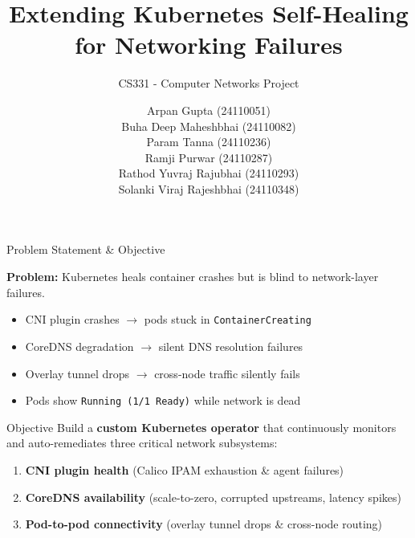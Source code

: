 \documentclass[aspectratio=169, 11pt]{beamer}
\title{Extending Kubernetes Self-Healing\\for Networking Failures}
\subtitle{CS331 - Computer Networks Project}
\author{
  Arpan Gupta (24110051) \\ 
  Buha Deep Maheshbhai (24110082) \\ 
  Param Tanna (24110236) \\  
  Ramji Purwar (24110287) \\ 
  Rathod Yuvraj Rajubhai (24110293) \\ 
  Solanki Viraj Rajeshbhai (24110348) \\
}
\date[]{}
\begin{document}
\begin{frame}[plain]
  \titlepage
\end{frame}

\begin{frame}{Problem Statement \& Objective}

\textbf{Problem:} Kubernetes heals container crashes but is \alert{blind to network-layer failures}.

\begin{itemize}
  \item CNI plugin crashes $\to$ pods stuck in \texttt{ContainerCreating}
  \item CoreDNS degradation $\to$ silent DNS resolution failures
  \item Overlay tunnel drops $\to$ cross-node traffic silently fails
  \item Pods show \texttt{Running (1/1 Ready)} while network is dead
\end{itemize}

\vspace{6pt}

\begin{block}{Objective}
Build a \textbf{custom Kubernetes operator} that continuously monitors and auto-remediates three critical network subsystems:
\begin{enumerate}
  \item \textbf{CNI plugin health} (Calico IPAM exhaustion \& agent failures)
  \item \textbf{CoreDNS availability} (scale-to-zero, corrupted upstreams, latency spikes)
  \item \textbf{Pod-to-pod connectivity} (overlay tunnel drops \& cross-node routing)
\end{enumerate}
\end{block}

\end{frame}
\end{document}
